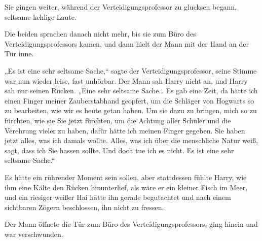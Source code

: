 Sie gingen weiter, während der Verteidigungsprofessor zu glucksen begann, seltsame kehlige Laute.

Die beiden sprachen danach nicht mehr, bis sie zum Büro des Verteidigungsprofessors kamen, und dann hielt der Mann mit der Hand an der Tür inne.

„Es ist eine sehr seltsame Sache,“ sagte der Verteidigungsprofessor, seine Stimme war nun wieder leise, fast unhörbar. Der Mann sah Harry nicht an, und Harry sah nur seinen Rücken. „Eine sehr seltsame Sache… Es gab eine Zeit, da hätte ich einen Finger meiner Zauberstabhand geopfert, um die Schläger von Hogwarts so zu bearbeiten, wie wir es heute getan haben. Um sie dazu zu bringen, mich so zu fürchten, wie sie Sie jetzt fürchten, um die Achtung aller Schüler und die Verehrung vieler zu haben, dafür hätte ich meinen Finger gegeben. Sie haben jetzt alles, was ich damals wollte. Alles, was ich über die menschliche Natur weiß, sagt, dass ich Sie hassen sollte. Und doch tue ich es nicht. Es ist eine sehr seltsame Sache.“

Es hätte ein rührender Moment sein sollen, aber stattdessen fühlte Harry, wie ihm eine Kälte den Rücken hinunterlief, als wäre er ein kleiner Fisch im Meer, und ein riesiger weißer Hai hätte ihn gerade begutachtet und nach einem sichtbaren Zögern beschlossen, ihn nicht zu fressen.

Der Mann öffnete die Tür zum Büro des Verteidigungsprofessors, ging hinein und war verschwunden.

